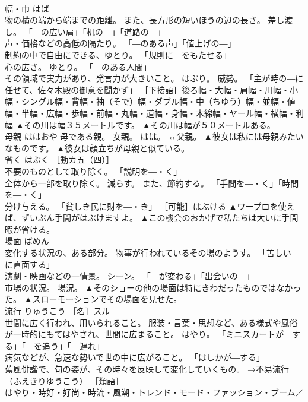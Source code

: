 \documentclass[8pt]{extreport}
\begin{document}
\begin{CJK}{UTF8}{min}
\\	幅・巾	はば	
\\	物の横の端から端までの距離。 また、長方形の短いほうの辺の長さ。 差し渡し。 「―の広い肩」「机の―」「道路の―」 
\\	声・価格などの高低の隔たり。 「―のある声」「値上げの―」 
\\	制約の中で自由にできる、ゆとり。 「規則に―をもたせる」 
\\	心の広さ。 ゆとり。 「―のある人間」 
\\	その領域で実力があり、発言力が大きいこと。 はぶり。 威勢。 「主が時の―に任せて、佐々木殿の御意を聞かず」 ［下接語］後ろ幅・大幅・肩幅・川幅・小幅・シングル幅・背幅・袖（そで）幅・ダブル幅・中（ちゆう）幅・並幅・値幅・半幅・広幅・歩幅・前幅・丸幅・道幅・身幅・木綿幅・ヤール幅・横幅・利幅	▲その川は幅３５メートルです。 ▲その川は幅が５０メートルある。
\\	母親	ははおや	母である親。 女親。 はは。 ↔父親。	▲彼女は私には母親みたいなものです。 ▲彼女は顔立ちが母親と似ている。
\\	省く	はぶく	［動カ五（四）］ 
\\	不要のものとして取り除く。 「説明を―・く」 
\\	全体から一部を取り除く。 減らす。 また、節約する。 「手間を―・く」「時間を―・く」 
\\	分け与える。 「貧しき民に財を―・き」 ［可能］はぶける	▲ワープロを使えば、ずいぶん手間がはぶけますよ。 ▲この機会のおかげで私たちは大いに手間暇が省ける。
\\	場面	ばめん	
\\	変化する状況の、ある部分。 物事が行われているその場のようす。 「苦しい―に直面する」 
\\	演劇・映画などの一情景。 シーン。 「―が変わる」「出会いの―」 
\\	市場の状況。 場況。	▲そのショーの他の場面は特にきわだったものではなかった。 ▲スローモーションでその場面を見せた。
\\	流行	りゅうこう	［名］スル 
\\	世間に広く行われ、用いられること。 服装・言葉・思想など、ある様式や風俗が一時的にもてはやされ、世間に広まること。 はやり。 「ミニスカートが―する」「―を追う」「―遅れ」 
\\	病気などが、急速な勢いで世の中に広がること。 「はしかが―する」 
\\	蕉風俳諧で、句の姿が、その時々を反映して変化していくもの。 →不易流行（ふえきりゆうこう） ［類語］
\\	はやり・時好・好尚・時流・風潮・トレンド・モード・ファッション・ブーム／

\end{CJK}
\end{document}
